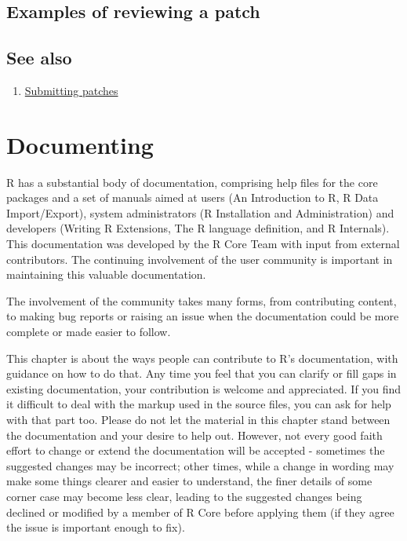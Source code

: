 \documentclass[
]{book}
\providecommand{\tightlist}{%
  \setlength{\itemsep}{0pt}\setlength{\parskip}{0pt}}
\begin{document}
\section{Examples of reviewing a patch}\label{examples-of-reviewing-a-patch}

\section{See also}\label{see-also-4}

\begin{enumerate}
\def\labelenumi{\arabic{enumi}.}
\tightlist
\item
  \href{https://www.r-project.org/bugs.html\#how-to-submit-patches}{Submitting patches}
\end{enumerate}

\chapter{Documenting}\label{Doc}

R has a substantial body of documentation, comprising help files for the core packages and a set of manuals aimed at users (An Introduction to R, R Data Import/Export), system administrators (R Installation and Administration) and developers (Writing R Extensions, The R language definition, and R Internals). This documentation was developed by the R Core Team with input from external contributors. The continuing involvement of the user community is important in maintaining this valuable documentation.

The involvement of the community takes many forms, from contributing content, to making bug reports or raising an issue when the documentation could be more complete or made easier to follow.

This chapter is about the ways people can contribute to R's documentation, with guidance on how to do that. Any time you feel that you can clarify or fill gaps in existing documentation, your contribution is welcome and appreciated. If you find it difficult to deal with the markup used in the source files, you can ask for help with that part too. Please do not let the material in this chapter stand between the documentation and your desire to help out. However, not every good faith effort to change or extend the documentation will be accepted - sometimes the suggested changes may be incorrect; other times, while a change in wording may make some things clearer and easier to understand, the finer details of some corner case may become less clear, leading to the suggested changes being declined or modified by a member of R Core before applying them (if they agree the issue is important enough to fix).
\end{document}
